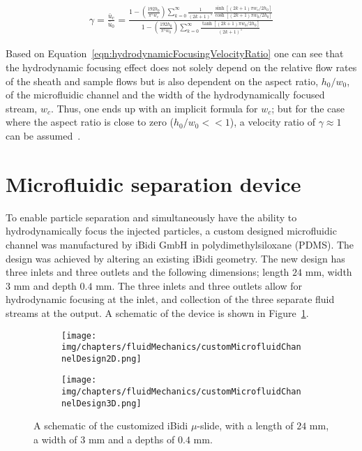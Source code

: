 \begin{eqnarray}
	\gamma = \frac{\bar{u}_{c}}{\bar{u}_{0}} = \frac{1-\left( \frac{192 h_{0}}{\pi^{5}w_{c}}\right)\sum_{k=0}^{\infty}\frac{1}{(2k+1)^{5}}\frac{\sinh[(2k+1)\pi w_{c}/2h_{0}]}{\cosh[(2k+1)\pi w_{0}/2h_{0}]}}{1-\left(\frac{192 h_{0}}{\pi^{5}w_{0}}\right)\sum_{k=0}^{\infty}\frac{\tanh[(2k+1)\pi w_{0}/2h_{0}]}{(2k+1)^{5}}}
	\label{eqn:hydrodynamicFocusingVelocityRatio}
\end{eqnarray}

Based on Equation~\ref{eqn:hydrodynamicFocusingVelocityRatio} one can see that the hydrodynamic focusing effect does not solely depend on the relative flow rates of the sheath and sample flows but is also dependent on the aspect ratio, $h_{0}/w_{0}$,  of the microfluidic channel and the width of the hydrodynamically focused stream, $w_{c}$. Thus, one ends up with an implicit formula for $w_{c}$; but for the case where the aspect ratio is close to zero ($h_{0}/w_{0} << 1$), a velocity ratio of $\gamma \approx 1$ can be assumed~\cite{Stiles2005}.

\section{Microfluidic separation device}\label{sec:microfluidicSeparationDevice}
To enable particle separation and simultaneously have the ability to hydrodynamically focus the injected particles, a custom designed microfluidic channel was manufactured by iBidi GmbH in polydimethylsiloxane (PDMS). The design was achieved by altering an existing iBidi geometry. The new design has three inlets and three outlets and the following dimensions; length $24$ mm, width $3$ mm and depth $0.4$ mm. The three inlets and three outlets allow for hydrodynamic focusing at the inlet, and collection of the three separate fluid streams at the output. A schematic of the device is shown in Figure~\ref{fig:newMicrofluidChannelDesign}. 

\begin{figure}[htb]
        \centering
        \begin{subfigure}[b]{0.48\textwidth}
                \texttt{[image: img/chapters/fluidMechanics/customMicrofluidChannelDesign2D.png]}
                \caption{}  
        \end{subfigure}
        \begin{subfigure}[b]{0.48\textwidth}
                \texttt{[image: img/chapters/fluidMechanics/customMicrofluidChannelDesign3D.png]}
                \caption{}                
        \end{subfigure}
        \caption[Schematic of the customized iBidi $\mu$-slide]{A schematic of the customized iBidi $\mu$-slide, with a length of $24$ mm, a width of $3$ mm and a depths of $0.4$ mm.}
        \label{fig:newMicrofluidChannelDesign}
\end{figure}

